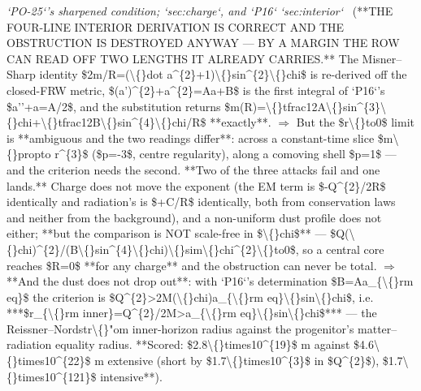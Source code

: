 \begin{description}
\textit{`PO-25`'s sharpened condition; `sec:charge`, and `P16` `sec:interior`} \ (**THE FOUR-LINE INTERIOR DERIVATION IS CORRECT AND THE OBSTRUCTION IS DESTROYED ANYWAY --- BY A MARGIN THE ROW CAN READ OFF TWO LENGTHS IT ALREADY CARRIES.** The Misner--Sharp identity \$2m/R=(\textbackslash\{\}dot a\textasciicircum{}\{2\}+1)\textbackslash\{\}sin\textasciicircum{}\{2\}\textbackslash\{\}chi\$ is re-derived off the closed-FRW metric, \$(a')\textasciicircum{}\{2\}+a\textasciicircum{}\{2\}=Aa+B\$ is the first integral of `P16`'s \$a''+a=A/2\$, and the substitution returns \$m(R)=\textbackslash\{\}tfrac12A\textbackslash\{\}sin\textasciicircum{}\{3\}\textbackslash\{\}chi+\textbackslash\{\}tfrac12B\textbackslash\{\}sin\textasciicircum{}\{4\}\textbackslash\{\}chi/R\$ **exactly**. \ensuremath{\Rightarrow} But the \$r\textbackslash\{\}to0\$ limit is **ambiguous and the two readings differ**: across a constant-time slice \$m\textbackslash\{\}propto r\textasciicircum{}\{3\}\$ (\$p=-3\$, centre regularity), along a comoving shell \$p=1\$ --- and the criterion needs the second.  **Two of the three attacks fail and one lands.** Charge does not move the exponent (the EM term is \$-Q\textasciicircum{}\{2\}/2R\$ identically and radiation's is \$+C/R\$ identically, both from conservation laws and neither from the background), and a non-uniform dust profile does not either; **but the comparison is NOT scale-free in \$\textbackslash\{\}chi\$** --- \$Q(\textbackslash\{\}chi)\textasciicircum{}\{2\}/(B\textbackslash\{\}sin\textasciicircum{}\{4\}\textbackslash\{\}chi)\textbackslash\{\}sim\textbackslash\{\}chi\textasciicircum{}\{2\}\textbackslash\{\}to0\$, so a central core reaches \$R=0\$ **for any charge** and the obstruction can never be total. \ensuremath{\Rightarrow} **And the dust does not drop out**: with `P16`'s determination \$B=Aa\_\{\textbackslash\{\}rm eq\}\$ the criterion is \$Q\textasciicircum{}\{2\}>2M(\textbackslash\{\}chi)a\_\{\textbackslash\{\}rm eq\}\textbackslash\{\}sin\textbackslash\{\}chi\$, i.e. ***\$r\_\{\textbackslash\{\}rm inner\}=Q\textasciicircum{}\{2\}/2M>a\_\{\textbackslash\{\}rm eq\}\textbackslash\{\}sin\textbackslash\{\}chi\$*** --- the Reissner--Nordstr\textbackslash\{\}"om inner-horizon radius against the progenitor's matter--radiation equality radius. **Scored: \$2.8\textbackslash\{\}times10\textasciicircum{}\{19\}\$ m against \$4.6\textbackslash\{\}times10\textasciicircum{}\{22\}\$ m extensive (short by \$1.7\textbackslash\{\}times10\textasciicircum{}\{3\}\$ in \$Q\textasciicircum{}\{2\}\$), \$1.7\textbackslash\{\}times10\textasciicircum{}\{121\}\$ intensive**). 

\end{description}

